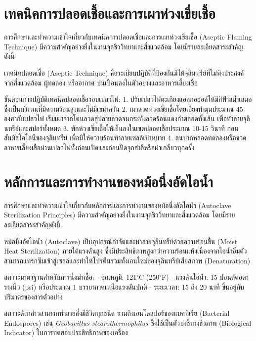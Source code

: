 \section{เทคนิคการปลอดเชื้อและการเผาห่วงเขี่ยเชื้อ}

การศึกษาและทำความเข้าใจเกี่ยวกับเทคนิคการปลอดเชื้อและการเผาห่วงเขี่ยเชื้อ (Aseptic Flaming Technique) มีความสำคัญอย่างยิ่งในงานจุลชีววิทยาและสิ่งแวดล้อม โดยมีรายละเอียดสาระสำคัญดังนี้

เทคนิคปลอดเชื้อ (Aseptic Technique) คือระเบียบปฏิบัติที่ป้องกันมิให้จุลินทรีย์ที่ไม่พึงประสงค์จากสิ่งแวดล้อม ผู้ทดลอง หรืออากาศ ปนเปื้อนลงในตัวอย่างและอาหารเลี้ยงเชื้อ

ขั้นตอนการปฏิบัติเทคนิคปลอดเชื้อรอบเปลวไฟ:
1. ปรับเปลวไฟตะเกียงแอลกอฮอล์ให้มีสีฟ้าสม่ำเสมอ ซึ่งเป็นบริเวณที่มีความร้อนสูงและไม่มีเขม่าควัน
2. เผาลวดห่วงเขี่ยเชื้อโดยเอียงทำมุมประมาณ 45 องศากับเปลวไฟ เริ่มเผาจากโคนลวดสู่ปลายลวดจนกระทั่งลวดร้อนแดงก่ำตลอดทั้งเส้น เพื่อทำลายจุลินทรีย์และสปอร์ทั้งหมด
3. พักห่วงเขี่ยเชื้อให้เย็นลงในเขตปลอดเชื้อประมาณ 10-15 วินาที ก่อนสัมผัสโคโลนีของจุลินทรีย์ เพื่อมิให้ความร้อนทำลายเซลล์เป้าหมาย
4. ลนปากหลอดทดลองหรือขวดอาหารเลี้ยงเชื้อผ่านเปลวไฟทั้งก่อนเปิดและก่อนปิดจุกสำลีหรือฝาเกลียวทุกครั้ง

\section{หลักการและการทำงานของหม้อนึ่งอัดไอน้ำ}

การศึกษาและทำความเข้าใจเกี่ยวกับหลักการและการทำงานของหม้อนึ่งอัดไอน้ำ (Autoclave Sterilization Principles) มีความสำคัญอย่างยิ่งในงานจุลชีววิทยาและสิ่งแวดล้อม โดยมีรายละเอียดสาระสำคัญดังนี้

หม้อนึ่งอัดไอน้ำ (Autoclave) เป็นอุปกรณ์กำจัดและทำลายจุลินทรีย์ด้วยความร้อนชื้น (Moist Heat Sterilization) ภายใต้แรงดันสูง ซึ่งมีประสิทธิภาพสูงกว่าความร้อนแห้งเนื่องจากไอน้ำอิ่มตัวสามารถแทรกซึมเข้าสู่เซลล์และทำให้โปรตีนรวมทั้งเอนไซม์ของจุลินทรีย์เสียสภาพ (Denaturation)

สภาวะมาตรฐานสำหรับการนึ่งฆ่าเชื้อ:
- อุณหภูมิ: 121$^{\circ}$C (250$^{\circ}$F)
- แรงดันไอน้ำ: 15 ปอนด์ต่อตารางนิ้ว (psi) หรือประมาณ 1 บรรยากาศเหนือแรงดันปกติ
- ระยะเวลา: 15 ถึง 20 นาที ขึ้นอยู่กับปริมาตรของสารตัวอย่าง

สภาวะดังกล่าวสามารถทำลายสิ่งมีชีวิตทุกชนิด รวมถึงเอนโดสปอร์ของแบคทีเรีย (Bacterial Endospores) เช่น \textit{Geobacillus stearothermophilus} ซึ่งใช้เป็นตัวบ่งชี้ทางชีวภาพ (Biological Indicator) ในการทดสอบประสิทธิภาพของเครื่อง

